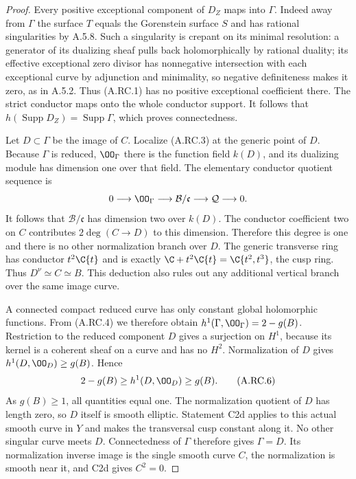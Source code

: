 \begin{proof}
Every positive exceptional component of $D_Z$ maps into
$\Gamma$. Indeed away from $\Gamma$ the surface $T$ equals
the Gorenstein surface $S$ and has rational singularities by
A.5.8. Such a singularity is crepant on its minimal resolution:
a generator of its dualizing sheaf pulls back holomorphically
by rational duality; its effective exceptional zero divisor
has nonnegative intersection with each exceptional curve by
adjunction and minimality, so negative definiteness makes it
zero, as in A.5.2. Thus (A.RC.1) has no positive exceptional
coefficient there. The strict conductor maps onto the whole
conductor support. It follows that
$h(\operatorname{Supp}D_Z)=\operatorname{Supp}\Gamma$,
which proves connectedness.

Let $D\subset\Gamma$ be the image of $C$. Localize (A.RC.3)
at the generic point of $D$. Because $\Gamma$ is reduced,
$\OO_\Gamma$ there is the function field $k(D)$, and its
dualizing module has dimension one over that field. The
elementary conductor quotient sequence is
\[
 0\longrightarrow\OO_\Gamma\longrightarrow
          \mathcal B/\mathfrak c
   \longrightarrow\mathcal Q\longrightarrow0.
\]
It follows that $\mathcal B/\mathfrak c$ has dimension two
over $k(D)$. The conductor coefficient two on $C$ contributes
$2\deg(C\to D)$ to this dimension. Therefore this degree is
one and there is no other normalization branch over $D$.
The generic transverse ring has conductor $t^2\C\{t\}$ and
is exactly $\C+t^2\C\{t\}=\C\{t^2,t^3\}$, the cusp ring.
Thus $D^\nu\simeq C\simeq B$. This deduction also rules out
any additional vertical branch over the same image curve.

A connected compact reduced curve has only constant global
holomorphic functions. From (A.RC.4) we therefore obtain
$h^1(\Gamma,\OO_\Gamma)=2-g(B)$.
Restriction to the reduced component $D$ gives a surjection
on $H^1$, because its kernel is a coherent sheaf on a curve
and has no $H^2$. Normalization of $D$ gives
$h^1(D,\OO_D)\ge g(B)$. Hence
\[
             2-g(B)\ge h^1(D,\OO_D)\ge g(B).         \tag{A.RC.6}
\]
As $g(B)\ge1$, all quantities equal one. The normalization
quotient of $D$ has length zero, so $D$ itself is smooth
elliptic. Statement C2d applies to this actual smooth curve
in $Y$ and makes the transversal cusp constant along it.
No other singular curve meets $D$. Connectedness of $\Gamma$
therefore gives $\Gamma=D$. Its normalization inverse image
is the single smooth curve $C$, the normalization is smooth
near it, and C2d gives $C^2=0$.


\end{proof}
